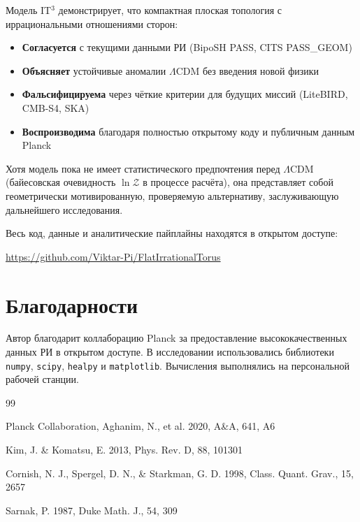 \documentclass[a4paper,11pt]{article}
\begin{document}
Модель IT$^3$ демонстрирует, что компактная плоская топология с иррациональными отношениями сторон:
\begin{itemize}
\item \textbf{Согласуется} с текущими данными РИ (BipoSH PASS, CITS PASS\_GEOM)
\item \textbf{Объясняет} устойчивые аномалии $\Lambda$CDM без введения новой физики
\item \textbf{Фальсифицируема} через чёткие критерии для будущих миссий (LiteBIRD, CMB-S4, SKA)
\item \textbf{Воспроизводима} благодаря полностью открытому коду и публичным данным Planck
\end{itemize}

Хотя модель пока не имеет статистического предпочтения перед $\Lambda$CDM (байесовская очевидность $\ln\mathcal{Z}$ в процессе расчёта), она представляет собой геометрически мотивированную, проверяемую альтернативу, заслуживающую дальнейшего исследования.

Весь код, данные и аналитические пайплайны находятся в открытом доступе:
\begin{center}
\url{https://github.com/Viktar-Pi/FlatIrrationalTorus}
\end{center}

\section*{Благодарности}

Автор благодарит коллаборацию Planck за предоставление высококачественных данных РИ в открытом доступе. В исследовании использовались библиотеки \texttt{numpy}, \texttt{scipy}, \texttt{healpy} и \texttt{matplotlib}. Вычисления выполнялись на персональной рабочей станции.

\begin{thebibliography}{99}

Planck Collaboration, Aghanim, N., et al. 2020, A\&A, 641, A6

Kim, J. \& Komatsu, E. 2013, Phys. Rev. D, 88, 101301

Cornish, N. J., Spergel, D. N., \& Starkman, G. D. 1998, Class. Quant. Grav., 15, 2657

Sarnak, P. 1987, Duke Math. J., 54, 309

\end{thebibliography}
\end{document}
